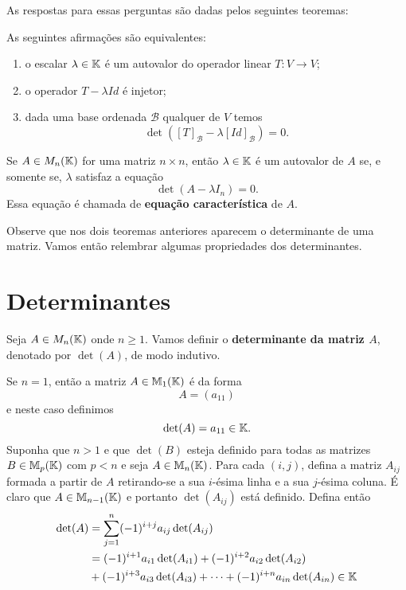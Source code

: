 As respostas para essas perguntas são dadas pelos seguintes teoremas:

\begin{teorema}
    As seguintes afirmações são equivalentes:
    \begin{enumerate}[label={\roman*})]
        \item o escalar $\lambda \in \mathbb{K}$ é um autovalor do operador linear $T \colon V \to V$;

        \item o operador $T - \lambda Id$ é injetor;

        \item dada uma base ordenada $\mathcal{B}$ qualquer de $V$ temos
            \[
                \det([T]_\mathcal{B} - \lambda[Id]_\mathcal{B}) = 0.
            \]
    \end{enumerate}
\end{teorema}

\begin{teorema}
    Se $A \in M_n(\mathbb{K})$ for uma matriz $n \times n$, então $\lambda \in \mathbb{K}$ é um autovalor de $A$ se, e somente se, $\lambda$
    satisfaz a equação
    \[
        \det(A - \lambda I_n) = 0.
    \]
    Essa equação é chamada de \textbf{equação característica} de $A$.
\end{teorema}

Observe que nos dois teoremas anteriores aparecem o determinante de uma matriz. Vamos então relembrar algumas propriedades dos
determinantes.

\section{Determinantes}

Seja $A \in M_n(\mathbb{K})$ onde $n \ge 1$. Vamos definir o \textbf{determinante da matriz $A$}, denotado por $\det(A)$, de modo indutivo.

Se $n = 1$, então a matriz $A \in \mathbb{M}_1(\mathbb{K})$ é da forma
\[
    A = (a_{11})
\]
e neste caso definimos
\[
    \det(A) = a_{11} \in \mathbb{K}.
\]
Suponha que $n > 1$ e que $\det(B)$ esteja definido para todas as matrizes $B \in \mathbb{M}_p(\mathbb{K})$ com $p < n$ e seja
$A \in \mathbb{M}_n(\mathbb{K})$. Para cada $(i,j)$, defina a matriz $A_{ij}$ formada a partir de $A$ retirando-se a sua $i$-ésima linha e a
sua $j$-ésima coluna. É claro que $A \in \mathbb{M}_{n - 1}(\mathbb{K})$ e portanto $\det(A_{ij})$ está definido. Defina então
\begin{align*}
    \det(A) &= \sum_{j = 1}^n(-1)^{i + j}a_{ij}\det(A_{ij}) \\ &= (-1)^{i + 1}a_{i1}\det(A_{i1}) + (-1)^{i + 2}a_{i2}\det(A_{i2}) \\ & +
    (-1)^{i + 3}a_{i3}\det(A_{i3}) + \cdots + (-1)^{i + n}a_{in}\det(A_{in}) \in \mathbb{K}
\end{align*}

